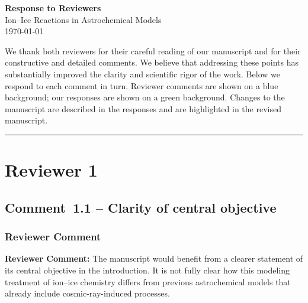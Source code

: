 \documentclass[12pt]{article}
\newcommand{\reviewlabel}{\textbf{\textcolor{commentframe}{Reviewer Comment:}}}
\begin{document}
\begin{center}
  {\LARGE \textbf{Response to Reviewers}} \\[0.5em]
  {\large Ion--Ice Reactions in Astrochemical Models} \\[0.5em]
  {\normalsize \today}
\end{center}

\bigskip

We thank both reviewers for their careful reading of our manuscript and for
their constructive and detailed comments. We believe that addressing these
points has substantially improved the clarity and scientific rigor of the
work. Below we respond to each comment in turn. Reviewer comments are shown
on a \textcolor{commentframe}{blue} background; our responses are shown on a
\textcolor{responseframe}{green} background. Changes to the manuscript are
described in the responses and are highlighted in the revised manuscript.

\bigskip
\hrule
\bigskip

\section{Reviewer 1}

\subsection{Comment~1.1 -- Clarity of central objective}

\subsubsection{Reviewer Comment}
\begin{reviewerbox}
\reviewlabel{} The manuscript would benefit from a clearer statement of its
central objective in the introduction. It is not fully clear how this
modeling treatment of ion--ice chemistry differs from previous astrochemical
models that already include cosmic-ray-induced processes.
\end{reviewerbox}
\end{document}
